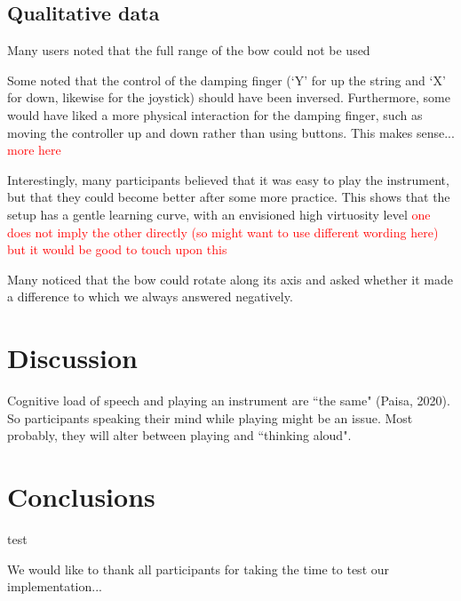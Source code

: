 \documentclass[dvipsnames, pdftex]{article}
\def\SWcomment[#1]{\textcolor{Red}{#1}}
\begin{document}
\subsection{Qualitative data}
Many users noted that the full range of the bow could not be used

Some noted that the control of the damping finger (`Y' for up the string and `X' for down, likewise for the joystick) should have been inversed. Furthermore, some would have liked a more physical interaction for the damping finger, such as moving the controller up and down rather than using buttons. This makes sense... \SWcomment[more here]

Interestingly, many participants believed that it was easy to play the instrument, but that they could become better after some more practice. This shows that the setup has a gentle learning curve, with an envisioned high virtuosity level \SWcomment[one does not imply the other directly (so might want to use different wording here) but it would be good to touch upon this]

Many noticed that the bow could rotate along its axis and asked whether it made a difference to which we always answered negatively. 

\section{Discussion}\label{sec:discussion}
Cognitive load of speech and playing an instrument are ``the same" (Paisa, 2020). So participants speaking their mind while playing might be an issue. Most probably, they will alter between playing and ``thinking aloud". 

\section{Conclusions}
test

\begin{acknowledgments}
We would like to thank all participants for taking the time to test our implementation...
\end{acknowledgments} 


\end{document}

